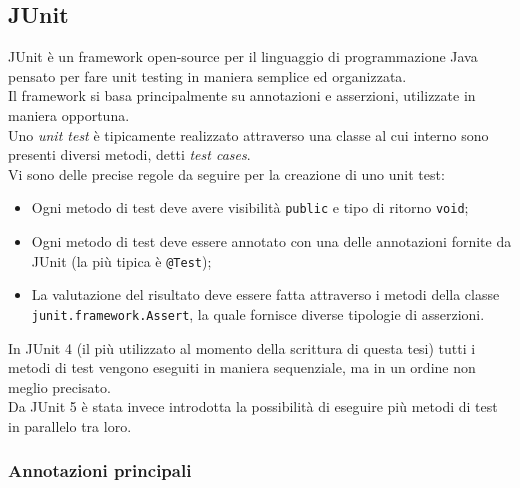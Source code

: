 \clearpage

\subsection{JUnit}
JUnit è un framework open-source per il linguaggio di programmazione Java pensato per fare unit testing in maniera semplice ed organizzata.\\
Il framework si basa principalmente su annotazioni e asserzioni, utilizzate in maniera opportuna.\\
Uno \emph{unit test} è tipicamente realizzato attraverso una classe al cui interno sono presenti diversi metodi, detti \emph{test cases}.\\
Vi sono delle precise regole da seguire per la creazione di uno unit test:
\begin{itemize}
\item Ogni metodo di test deve avere visibilità \texttt{public} e tipo di ritorno \texttt{void};
\item Ogni metodo di test deve essere annotato con una delle annotazioni fornite da JUnit (la più tipica è \texttt{@Test});
\item La valutazione del risultato deve essere fatta attraverso i metodi della classe \texttt{junit.framework.Assert}, la quale fornisce diverse tipologie di asserzioni.
\end{itemize}

In JUnit 4 (il più utilizzato al momento della scrittura di questa tesi) tutti i metodi di test vengono eseguiti in maniera sequenziale, ma in un ordine non meglio precisato.\\
Da JUnit 5 è stata invece introdotta la possibilità di eseguire più metodi di test in parallelo tra loro.\\

\subsubsection{Annotazioni principali}

